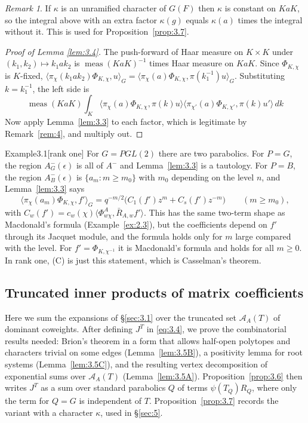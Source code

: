 \documentclass[12pt,letterpaper]{article}
\numberwithin{equation}{section}
\theoremstyle{plain}
\theoremstyle{remark}
\newtheorem{remarkold}{Remark}%
\theoremstyle{plain}
\theoremstyle{definition}
\theoremstyle{remark}
\theoremstyle{remark}
\newcommand{\cA}{\mathcal{A}}
\newcommand{\ip}[1]{\langle #1\rangle}
\DeclareMathOperator{\meas}{meas}
\begin{document}
\begin{remarkold}\label{rem:5}
If $\kappa$ is an unramified character of $G(F)$ then $\kappa$ is constant on $KaK$, so the integral above with an extra factor $\kappa(g)$ equals $\kappa(a)$ times the integral without it. This is used for Proposition~\ref{prop:3.7}.
\end{remarkold}

\begin{proof}[Proof of Lemma \ref{lem:3.4}]
The push-forward of Haar measure on $K\times K$ under $(k_1,k_2)\mapsto k_1ak_2$ is $\meas(KaK)^{-1}$ times Haar measure on $KaK$. Since $\Phi_{K,\chi}$ is $K$-fixed, $\ip{\pi_\chi(k_1ak_2)\Phi_{K,\chi},u}_G=\ip{\pi_\chi(a)\Phi_{K,\chi},\pi(k_1^{-1})u}_G$. Substituting $k=k_1^{-1}$, the left side is
\[
\meas(KaK)\int_K\ip{\pi_\chi(a)\Phi_{K,\chi},\pi(k)u}\ip{\pi_{\chi'}(a)\Phi_{K,\chi'},\pi(k)u'}\,dk
\]
Now apply Lemma~\ref{lem:3.3} to each factor, which is legitimate by Remark~\ref{rem:4}, and multiply out.
\end{proof}

\begin{fixedrem}{Example}{3.1}[rank one]\label{ex:3.1}
For $G=PGL(2)$ there are two parabolics. For $P=G$, the region $A^-_G(\epsilon)$ is all of $A^-$ and Lemma~\ref{lem:3.3} is a tautology. For $P=B$, the region $A^-_B(\epsilon)$ is $\{a_m:m\ge m_0\}$ with $m_0$ depending on the level $n$, and Lemma~\ref{lem:3.3} says
\[
\ip{\pi_\chi(a_m)\Phi_{K,\chi},f'}_G=q^{-m/2}\big(C_1(f')z^m+C_s(f')z^{-m}\big)\qquad(m\ge m_0),
\]
with $C_w(f')=c_w(\chi)\ip{\Phi^A_{w\chi},\bar R_{A,w}f'}$. This has the same two-term shape as Macdonald's formula (Example~\ref{ex:2.3}), but the coefficients depend on $f'$ through its Jacquet module, and the formula holds only for $m$ large compared with the level. For $f'=\Phi_{K,\chi^{-1}}$ it is Macdonald's formula and holds for all $m\ge0$. In rank one, (C) is just this statement, which is Casselman's theorem.
\end{fixedrem}

\subsection{Truncated inner products of matrix coefficients}\label{sec:3.2}

Here we sum the expansions of \S\ref{sec:3.1} over the truncated set $\cA_A(T)$ of dominant coweights. After defining $J^T$ in \eqref{eq:3.4}, we prove the combinatorial results needed: Brion's theorem in a form that allows half-open polytopes and characters trivial on some edges (Lemma~\ref{lem:3.5B}), a positivity lemma for root systems (Lemma~\ref{lem:3.5C}), and the resulting vertex decomposition of exponential sums over $\cA_A(T)$ (Lemma~\ref{lem:3.5A}). Proposition~\ref{prop:3.6} then writes $J^T$ as a sum over standard parabolics $Q$ of terms $\psi(T_Q)R_Q$, where only the term for $Q=G$ is independent of $T$. Proposition~\ref{prop:3.7} records the variant with a character $\kappa$, used in \S\ref{sec:5}.
\end{document}
